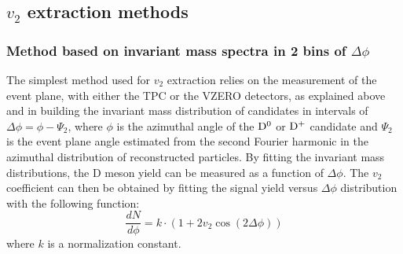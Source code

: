 \subsection{$v_2$ extraction methods} 

\subsubsection{Method based on invariant mass spectra in 2 bins of $\Delta\phi$} 
\label{epMethodsDescript}
The simplest method used for $v_2$ extraction relies on the 
measurement of the event plane, with either the TPC or the VZERO detectors, as 
explained above and in building the invariant mass distribution of candidates 
in intervals of $\Delta\phi= \phi - \Psi_2$, where $\phi$ is the azimuthal
angle of the ${\rm D^0}$ or ${\rm D^+}$ candidate and $\Psi_2$ is the event plane angle
estimated from the second Fourier harmonic in the azimuthal
distribution of reconstructed particles.
By fitting the invariant mass distributions, the D meson yield can be
measured as a function of $\Delta\phi$. 
The $v_2$ coefficient can then be obtained by fitting the signal yield 
versus $\Delta\phi$ distribution with the following function:
\begin{equation}\label{eq:v2D}
 \frac{dN}{d\phi} = k\cdot(1 + 2v_2\cos(2\Delta\phi))
\end{equation}
where $k$ is a normalization constant. 

